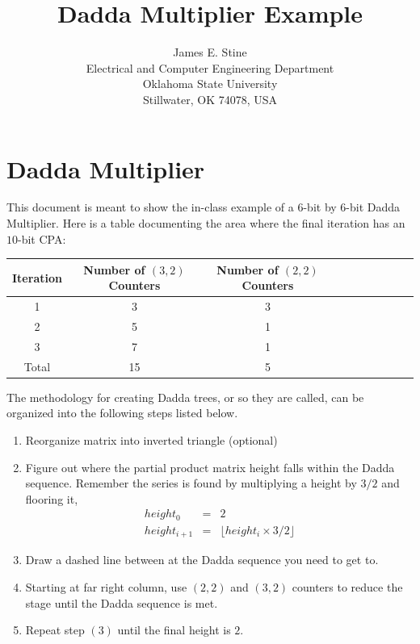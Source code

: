 \documentclass{article}
\begin{document}
\title{Dadda Multiplier Example}
\author{James E. Stine \\
Electrical and Computer Engineering Department\\
Oklahoma State University \\
Stillwater, OK 74078, USA}
\date{}

\maketitle

\section{Dadda Multiplier}
This document is meant to show the in-class example of a $6$-bit by $6$-bit
Dadda Multiplier.  
Here is
a table documenting the area where the final iteration has an $10$-bit CPA:
  \begin{table} [h]
    \centering
    \begin{tabular}{|c|c|c|c|c|c|c|c|c|c|} \hline
    Iteration & Number of $(3,2)$ Counters & Number of $(2,2)$ Counters \\
    \hline \hline
      1 & 3 & 3  \\ \hline
      2 & 5 & 1  \\ \hline
      3 & 7 & 1  \\ \hline \hline
  Total & 15 & 5 \\ \hline
    \end{tabular}
  \end{table}

The methodology
for creating Dadda trees, or so they are called, can
be organized into the following steps listed below.  
\begin{enumerate}
\item Reorganize matrix into inverted triangle (optional)
\item Figure out where the partial product matrix height falls within the
  Dadda sequence.  Remember the series is found by multiplying a height by
  $3/2$ and flooring it,
  \begin{eqnarray*}
  height_0 & = & 2 \\
  height_{i+1} & = & \lfloor height_i \times 3/2 \rfloor 
  \end{eqnarray*}
\item Draw a dashed line between at the Dadda sequence you need to get to.
\item Starting at far right column, use $(2,2)$ and $(3,2)$ counters to
  reduce the stage until the Dadda sequence is met.
\item Repeat step $(3)$ until the final height is $2$.
\end{enumerate}
\end{document}
